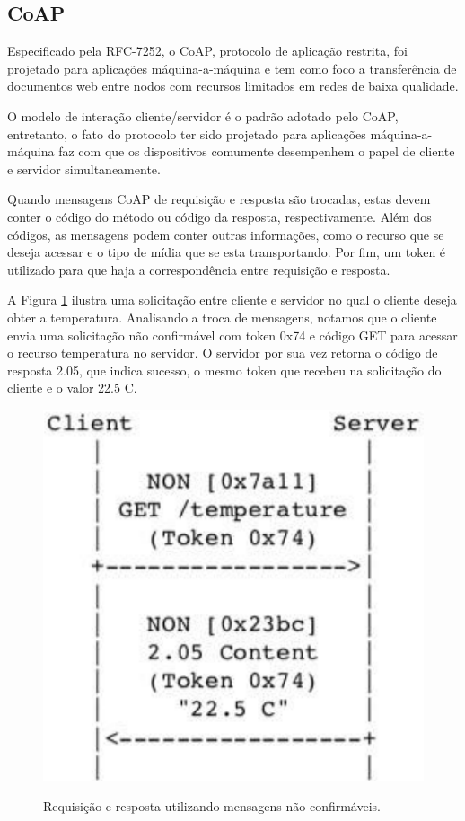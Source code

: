 \subsection{CoAP}

Especificado pela RFC-7252\cite{rfc7252}, o CoAP, protocolo de aplicação restrita, foi projetado para aplicações máquina-a-máquina
e tem como foco a transferência de documentos web entre nodos com recursos limitados em redes de baixa qualidade\cite{rfc7252}.

O modelo de interação cliente/servidor é o padrão adotado pelo CoAP, entretanto,
o fato do protocolo ter sido projetado para aplicações máquina-a-máquina faz com que os dispositivos comumente desempenhem o papel de cliente e servidor simultaneamente.

Quando mensagens CoAP de requisição e resposta são trocadas, estas devem conter o código do método ou código da resposta, respectivamente.
Além dos códigos, as mensagens podem conter outras informações, como o recurso que se deseja acessar e o tipo de mídia que se esta transportando.
Por fim, um token é utilizado para que haja a correspondência entre requisição e resposta.

A Figura \ref{fig:fig4} ilustra uma solicitação entre cliente e servidor no qual o cliente deseja obter a temperatura.
Analisando a troca de mensagens, notamos que o cliente envia uma solicitação não confirmável com token 0x74 e código GET para acessar o recurso temperatura no servidor.
O servidor por sua vez retorna o código de resposta 2.05, que indica sucesso, o mesmo token que recebeu na solicitação do cliente e o valor 22.5 C.

\begin{figure}[htb!]
    \centering\includegraphics[height=.5\textwidth]{fig4.pdf}
    \caption
    {\label{fig:fig4} Requisição e resposta utilizando mensagens não confirmáveis.} \cite{rfc7252}
\end{figure}

